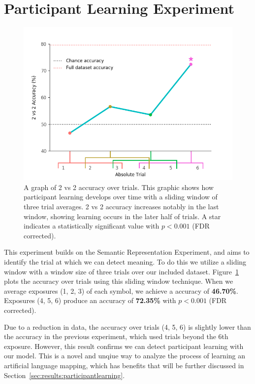 \section{Participant Learning Experiment}

\begin{figure}[t]
  \centering
  \includegraphics[width=0.75\linewidth]{figures/learning}
  \caption{
    A graph of 2 vs 2 accuracy over trials. This graphic shows how participant 
    learning develops over time with a sliding window of three trial averages.  
    2 vs 2 accuracy increases notably in the last window, showing learning 
    occurs in the later half of trials. A star indicates a statistically 
    significant value with $p < 0.001$ (FDR corrected).
  }
  \label{fig:learning}
\end{figure}

This experiment builds on the Semantic Representation Experiment, and aims to 
identify the trial at which we can detect meaning. To do this we utilize a 
sliding window with a window size of three trials over our included dataset.   
Figure~\ref{fig:learning} plots the \tvt accuracy over trials using this 
sliding window technique. When we average exposures (1, 2, 3) of each symbol, 
we achieve a \tvt accuracy of \textbf{46.70\%}. Exposures (4, 5, 6) produce an 
accuracy of \textbf{72.35\%} with $p < 0.001$ (FDR corrected). 

Due to a reduction in data, the \tvt accuracy over trials (4, 5, 6) is slightly 
lower than the \tvt accuracy in the previous experiment, which used trials 
beyond the 6th exposure. However, this result confirms we can detect 
participant learning with our model. This is a novel and unqiue way to analyze 
the process of learning an artificial language mapping, which has benefits that 
will be further discussed in Section~\ref{sec:results:participantlearning}.

